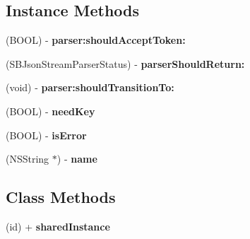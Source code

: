 \subsection*{Instance Methods}
\begin{DoxyCompactItemize}
\item 
\hypertarget{interface_s_b_json_stream_parser_state_a4c82e9be435d6f393bf5a0467c1e83eb}{(B\-O\-O\-L) -\/ {\bfseries parser\-:should\-Accept\-Token\-:}}\label{interface_s_b_json_stream_parser_state_a4c82e9be435d6f393bf5a0467c1e83eb}

\item 
\hypertarget{interface_s_b_json_stream_parser_state_a7ba884f572ebae244fd252055aed25fc}{(S\-B\-Json\-Stream\-Parser\-Status) -\/ {\bfseries parser\-Should\-Return\-:}}\label{interface_s_b_json_stream_parser_state_a7ba884f572ebae244fd252055aed25fc}

\item 
\hypertarget{interface_s_b_json_stream_parser_state_a5ed454a903b6bd268f1c1b373e243013}{(void) -\/ {\bfseries parser\-:should\-Transition\-To\-:}}\label{interface_s_b_json_stream_parser_state_a5ed454a903b6bd268f1c1b373e243013}

\item 
\hypertarget{interface_s_b_json_stream_parser_state_aab97dd88c338d285cc9aca7f21875ae1}{(B\-O\-O\-L) -\/ {\bfseries need\-Key}}\label{interface_s_b_json_stream_parser_state_aab97dd88c338d285cc9aca7f21875ae1}

\item 
\hypertarget{interface_s_b_json_stream_parser_state_a8d04c21bcd093e5817bdbff30f39ba46}{(B\-O\-O\-L) -\/ {\bfseries is\-Error}}\label{interface_s_b_json_stream_parser_state_a8d04c21bcd093e5817bdbff30f39ba46}

\item 
\hypertarget{interface_s_b_json_stream_parser_state_ae150e3c382beb444010927434679cf77}{(N\-S\-String $\ast$) -\/ {\bfseries name}}\label{interface_s_b_json_stream_parser_state_ae150e3c382beb444010927434679cf77}

\end{DoxyCompactItemize}
\subsection*{Class Methods}
\begin{DoxyCompactItemize}
\item 
\hypertarget{interface_s_b_json_stream_parser_state_ad17b227a54da2a32a63e5d1f586f0109}{(id) + {\bfseries shared\-Instance}}\label{interface_s_b_json_stream_parser_state_ad17b227a54da2a32a63e5d1f586f0109}

\end{DoxyCompactItemize}


